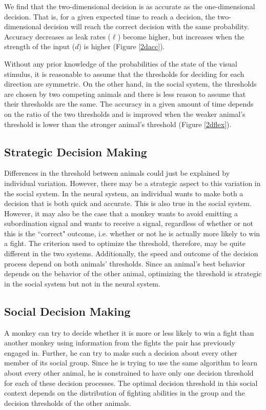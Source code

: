 \documentclass{article}
\begin{document}
We find that the two-dimensional decision is as accurate as the one-dimensional decision.  That is, for a given expected time to reach a decision, the two-dimensional decision will reach the correct decision with the same probability.  Accuracy decreases as leak rates ($\ell$) become higher, but increases when the strength of the input ($d$) is higher (Figure \ref{2dacc}).

Without any prior knowledge of the probabilities of the state of the visual stimulus, it is reasonable to assume that the thresholds for deciding for each direction are symmetric.  On the other hand, in the social system, the thresholds are chosen by two competing animals and there is less reason to assume that their thresholds are the same.  The accuracy in a given amount of time depends on the ratio of the two thresholds and is improved when the weaker animal's threshold is lower than the stronger animal's threshold (Figure \ref{2dflex}).  

\subsection{Strategic Decision Making }
Differences in the threshold between animals could just be explained by individual variation.  However, there may be a strategic aspect to this variation in the social system.  In the neural system, an individual wants to make both a decision that is both quick and accurate.  This is also true in the social system.  However, it may also be the case that a monkey wants to avoid emitting a subordination signal and wants to receive a signal, regardless of whether or not this is the ``correct" outcome, i.e. whether or not he is actually more likely to win a fight.  The criterion used to optimize the threshold, therefore, may be quite different in the two systems.  Additionally, the speed and outcome of the decision process depend on both animals' thresholds.  Since an animal's best behavior depends on the behavior of the other animal, optimizing the threshold is strategic in the social system but not in the neural system.  

\subsection{Social Decision Making }
A monkey can try to decide whether it is more or less likely to win a fight than another monkey using information from the fights the pair has previously engaged in.  Further, he can try to make such a decision about every other member of its social group.  Since he is trying to use the same algorithm to learn about every other animal, he is constrained to have only one decision threshold for each of these decision processes.  The optimal decision threshold in this social context depends on the distribution of fighting abilities in the group and the decision thresholds of the other animals. 
\end{document}
